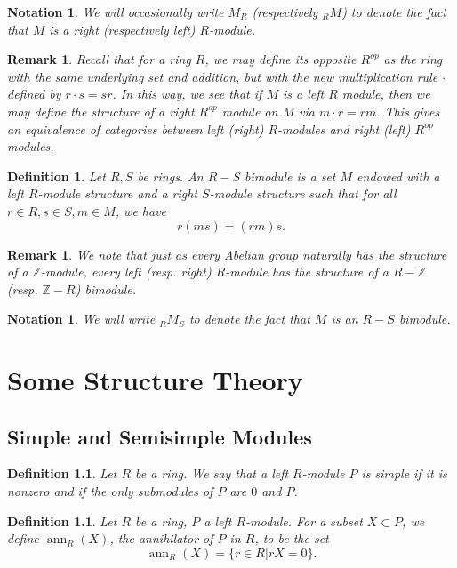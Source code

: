 \documentclass[12pt]{report}
\theoremstyle{plain}
\newtheorem{defn}[thm]{Definition}
\newtheorem{notn}[thm]{Notation}
\newtheorem{rem}[thm]{Remark}
\newcommand{\oper}[1]{\operatorname{#1}}
\newcommand{\ZZ}{\mathbb{Z}}
\newcommand{\ann}{\oper{ann}}
\begin{document}
\begin{notn}
We will occasionally write $M_R$ (respectively $_R M$) to denote the fact
that $M$ is a right (respectively left) $R$-module.
\end{notn}

\begin{rem}
Recall that for a ring $R$, we may define its opposite $R^{op}$ as the ring
with the same underlying set and addition, but with the new multiplication
rule $\cdot$ defined by $r \cdot s = sr$. In this way, we see
that if $M$ is a left $R$ module, then we may define the structure of a
right $R^{op}$ module on $M$ via $m \cdot r = rm$. This gives an
equivalence of categories between left (right) $R$-modules and right (left)
$R^{op}$ modules.
\end{rem}

\begin{defn}
Let $R, S$ be rings. An $R-S$ bimodule is a set $M$ endowed with a left
$R$-module structure and a right $S$-module structure such that for all $r
\in R, s \in S, m \in M$, we have
\[ r(m s) = (r m) s.\]
\end{defn}

\begin{rem}
We note that just as every Abelian group naturally has the structure of a
$\ZZ$-module, every left (resp. right) $R$-module has the structure of a
$R-\ZZ$ (resp. $\ZZ - R$) bimodule.
\end{rem}

\begin{notn}
We will write $_R M_S$ to denote the fact that $M$ is an $R-S$ bimodule.
\end{notn}


\chapter{Some Structure Theory}

\section{Simple and Semisimple Modules}

\begin{defn}
Let $R$ be a ring. We say that a left $R$-module $P$ is simple if it is nonzero
and if the only submodules of $P$ are $0$ and $P$.
\end{defn}

\begin{defn}
Let $R$ be a ring, $P$ a left $R$-module. For a subset $X \subset P$, we
define $\ann_R(X)$, the annihilator of $P$ in $R$, to be the set
\[\ann_R(X) = \{r \in R | rX = 0\}.\]
\end{defn}
\end{document}
